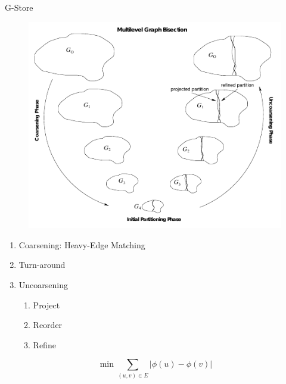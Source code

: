 \documentclass[rgb]{beamer}
\begin{document}
        \begin{frame}{G-Store}
            \begin{figure}[H]
                \begin{center}
                \includegraphics[keepaspectratio, height=0.8\textheight, width=\textwidth]{img/multilevel.png}\\
                \end{center}
            \end{figure}
            
            \framebreak
            \vfill\vspace{0pt}
            \begin{enumerate}
             \item Coarsening: Heavy-Edge Matching~\autocite{karypis}
             \item Turn-around
             \item Uncoarsening
                \begin{enumerate}
                 \item Project
                 \item Reorder
                 \item Refine\\ [3em]
                \end{enumerate}
            \end{enumerate}
             \[ \min \sum_{(u,v) \in E} |\phi(u) - \phi(v)| \] 
             

\end{frame}
\end{document}
